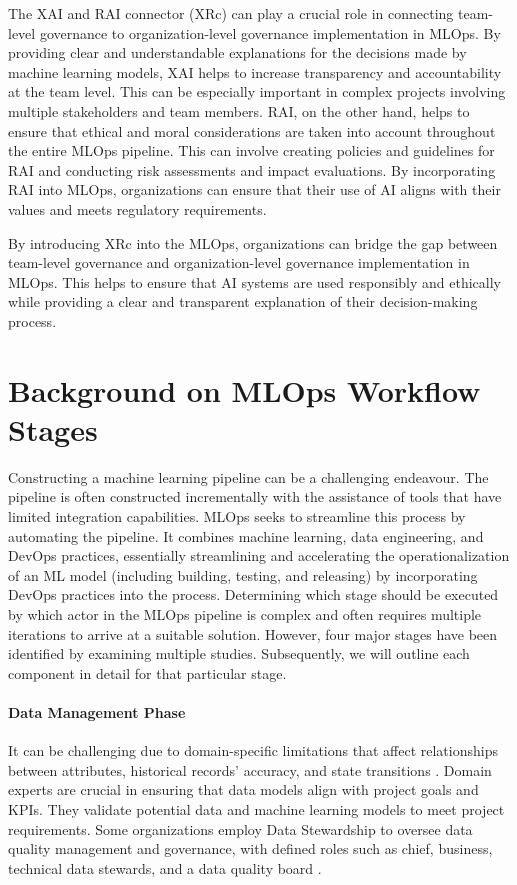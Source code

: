 \documentclass[conference]{IEEEtran}
\begin{document}
The XAI and RAI connector (XRc) can play a crucial role in connecting team-level governance to organization-level governance implementation in MLOps. By providing clear and understandable explanations for the decisions made by machine learning models, XAI helps to increase transparency and accountability at the team level. This can be especially important in complex projects involving multiple stakeholders and team members. RAI, on the other hand, helps to ensure that ethical and moral considerations are taken into account throughout the entire MLOps pipeline. This can involve creating policies and guidelines for RAI and conducting risk assessments and impact evaluations. By incorporating RAI into MLOps, organizations can ensure that their use of AI aligns with their values and meets regulatory requirements.

By introducing XRc into the MLOps, organizations can bridge the gap between team-level governance and organization-level governance implementation in MLOps. This helps to ensure that AI systems are used responsibly and ethically while providing a clear and transparent explanation of their decision-making process.

\section{Background on MLOps Workflow Stages}
Constructing a machine learning pipeline can be a challenging endeavour. The pipeline is often constructed incrementally with the assistance of tools that have limited integration capabilities. MLOps seeks to streamline this process by automating the pipeline. It combines machine learning, data engineering, and DevOps practices, essentially streamlining and accelerating the operationalization of an ML model (including building, testing, and releasing) by incorporating DevOps practices into the process. 
Determining which stage should be executed by which actor in the MLOps pipeline is complex and often requires multiple iterations to arrive at a suitable solution. However, four major stages have been identified by examining multiple studies. Subsequently, we will outline each component in detail for that particular stage.
\paragraph{Data Management Phase} It can be challenging due to domain-specific limitations \cite{maydanchik2007data} that affect relationships between attributes, historical records' accuracy, and state transitions \cite{taleb2018big}. Domain experts are crucial in ensuring that data models align with project goals and KPIs. They validate potential data and machine learning models to meet project requirements. Some organizations employ Data Stewardship to oversee data quality management and governance, with defined roles such as chief, business, technical data stewards, and a data quality board \cite{mons2018data}.
\end{document}
